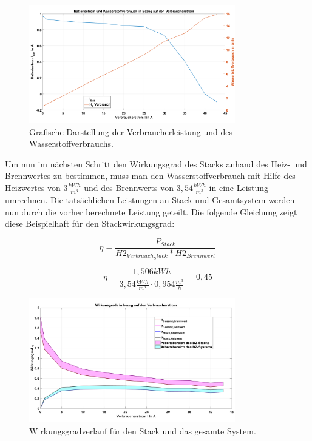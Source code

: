 \begin{figure}[H]
  \centering
  \includegraphics[width=0.8\textwidth]{Abbildungen/Aufgabe63_Leistungen_Ibat Vdot.png}
  \caption{Grafische Darstellung der Verbraucherleistung und des Wasserstoffverbrauchs.}
  \label{fig:230626_Ibat_Vdot}
\end{figure}

Um nun im nächsten Schritt den Wirkungsgrad des Stacks anhand des Heiz- und Brennwertes zu bestimmen, 
muss man den Wasserstoffverbrauch mit Hilfe des Heizwertes von $3 \frac{kWh}{m^3}$ und des Brennwerts von $3,54 \frac{kWh}{m^3}$ in eine Leistung umrechnen. 
Die tatsächlichen Leistungen an Stack und Gesamtsystem werden nun durch die vorher berechnete Leistung geteilt. 
Die folgende Gleichung zeigt diese Beispielhaft für den Stackwirkungsgrad:

\begin{equation}
 \eta= \frac{P_{Stack}}{H2_{Verbrauch_Stack}*H2_{Brennwert}}
  \label{eq:230627_Beispiel_wirkungsgrad_Berechnung}
\end{equation}

$$\eta= \frac{1,506 kWh}{3,54 \frac{kWh}{m^3 }\cdot 0,954 \frac{m^3}{h}}=0,45$$

\begin{figure}[H]
    \centering
    \includegraphics[width=0.8\textwidth]{Abbildungen/Aufgabe63_Wirkungsgrade.png}
    \caption{Wirkungsgradverlauf für den Stack und das gesamte System.}
    \label{fig:230626_Wirkungsgrade}
\end{figure}

